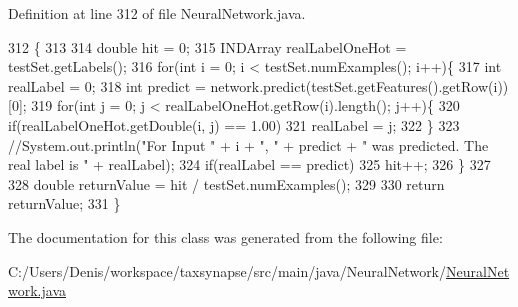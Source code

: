 Definition at line 312 of file Neural\+Network.\+java.


\begin{DoxyCode}
312                                        \{
313         
314         \textcolor{keywordtype}{double} hit = 0;
315         INDArray realLabelOneHot = testSet.getLabels();
316         \textcolor{keywordflow}{for}(\textcolor{keywordtype}{int} i = 0; i < testSet.numExamples(); i++)\{
317             \textcolor{keywordtype}{int} realLabel = 0;
318             \textcolor{keywordtype}{int} predict = network.predict(testSet.getFeatures().getRow(i))[0];
319             \textcolor{keywordflow}{for}(\textcolor{keywordtype}{int} j = 0; j < realLabelOneHot.getRow(i).length(); j++)\{
320                 \textcolor{keywordflow}{if}(realLabelOneHot.getDouble(i, j) == 1.00)
321                     realLabel = j;
322             \}
323             \textcolor{comment}{//System.out.println("For Input " + i + ", " + predict + " was predicted. The real label is " +
       realLabel);}
324             \textcolor{keywordflow}{if}(realLabel == predict)
325                 hit++;
326         \}
327         
328         \textcolor{keywordtype}{double} returnValue = hit / testSet.numExamples(); 
329             
330         \textcolor{keywordflow}{return} returnValue;
331     \}
\end{DoxyCode}


The documentation for this class was generated from the following file\+:\begin{DoxyCompactItemize}
\item 
C\+:/\+Users/\+Denis/workspace/taxsynapse/src/main/java/\+Neural\+Network/\hyperlink{_neural_network_8java}{Neural\+Network.\+java}\end{DoxyCompactItemize}
